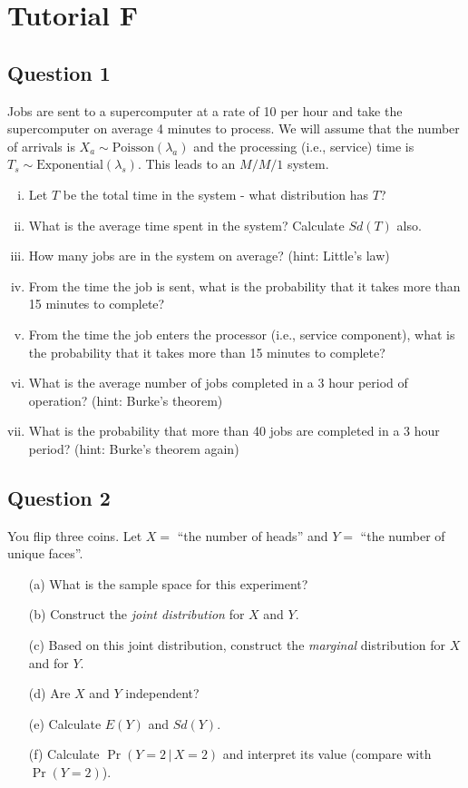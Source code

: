 \documentclass[]{report}
\begin{document}
\section{Tutorial F}

\subsection*{Question 1}
Jobs are sent to a supercomputer at a rate of 10 per hour and take the supercomputer on average 4 minutes to process. We will assume that the number of arrivals is $X_a \sim \text{Poisson}(\lambda_a)$ and the processing (i.e., service) time is $T_s \sim \text{Exponential}(\lambda_s)$. This leads to an $M/M/1$ system.\\[-0.2cm]

\begin{enumerate}[(i)]
\item Let $T$ be the total time in the system - what distribution has $T$? \item What is the average time spent in the system? Calculate $Sd(T)$ also. \item How many jobs are in the system on average? (hint: Little's law)  \item From the time the job is sent, what is the probability that it takes more than 15 minutes to complete? \item  From the time the job enters the processor (i.e., service component), what is the probability that it takes more than 15 minutes to complete? \item What is the average number of jobs completed in a 3 hour period of operation? (hint: Burke's theorem) \item What is the probability that more than 40 jobs are completed in a 3 hour period? (hint: Burke's theorem again)
\end{enumerate}








\subsection*{Question 2}
You flip three coins. Let $X = $ ``the number of heads'' and $Y = $ ``the number of unique faces''.\\[-0.2cm]
\begin{itemize}
\item[(a)] What is the sample space for this experiment?  \item[(b)] Construct the \emph{joint distribution} for $X$ and $Y$.  \item[(c)] Based on this joint distribution, construct the \emph{marginal} distribution for $X$ and for $Y$.  \item[(d)] Are $X$ and $Y$ independent?  \item[(e)] Calculate $E(Y)$ and $Sd(Y)$.  \item[(f)] Calculate $\Pr(Y=2\,|\,X=2)$ and interpret its value (compare with $\Pr(Y=2)$).
\end{itemize}
\end{document}
